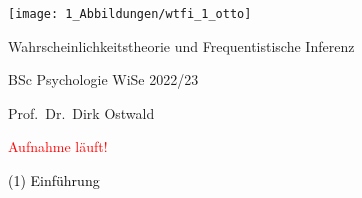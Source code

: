 \documentclass[
  8pt,
  ignorenonframetext,
]{beamer}
\author{}
\date{\vspace{-2.5em}}
\begin{document}
\begin{frame}[plain]{}
\protect\hypertarget{section}{}
\center

\begin{center}\texttt{[image: 1\_Abbildungen/wtfi\_1\_otto]} \end{center}

\vspace{2mm}

\Large

Wahrscheinlichkeitstheorie und Frequentistische Inferenz \vspace{6mm}

BSc Psychologie WiSe 2022/23

\vspace{6mm}

Prof.~Dr.~Dirk Ostwald
\end{frame}

\begin{frame}[plain]{}
\protect\hypertarget{section-1}{}
\vfill
\center
\Huge

\textcolor{red}{Aufnahme läuft!} \vfill
\end{frame}

\begin{frame}[plain]{}
\protect\hypertarget{section-2}{}
\vfill
\center
\huge

\textcolor{black}{(1) Einführung} \vfill
\end{frame}
\end{document}
